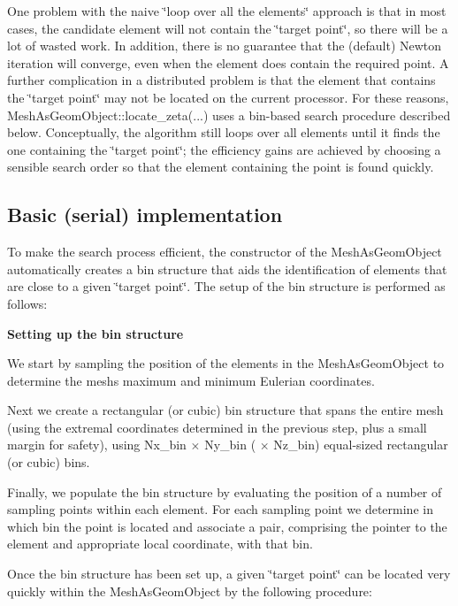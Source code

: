 One problem with the naive \char`\"{}loop over all the elements\char`\"{} approach is that in most cases, the candidate element will not contain the \char`\"{}target
point\char`\"{}, so there will be a lot of wasted work. In addition, there is no guarantee that the (default) Newton iteration will converge, even when the element does contain the required point. A further complication in a distributed problem is that the element that contains the \char`\"{}target point\char`\"{} may not be located on the current processor. For these reasons, {\ttfamily Mesh\+As\+Geom\+Object\+::locate\+\_\+zeta}(...) uses a bin-\/based search procedure described below. Conceptually, the algorithm still loops over all elements until it finds the one containing the \char`\"{}target
point\char`\"{}; the efficiency gains are achieved by choosing a sensible search order so that the element containing the point is found quickly.



\hypertarget{index_impl}{}\subsection{Basic (serial) implementation}\label{index_impl}
To make the search process efficient, the constructor of the {\ttfamily Mesh\+As\+Geom\+Object} automatically creates a bin structure that aids the identification of elements that are close to a given \char`\"{}target point\char`\"{}. The setup of the bin structure is performed as follows\+: \begin{center} {\bfseries Setting up the bin structure} \end{center} 
\begin{DoxyEnumerate}
\item We start by sampling the position of the elements in the {\ttfamily Mesh\+As\+Geom\+Object} to determine the mesh\textquotesingle{}s maximum and minimum Eulerian coordinates. ~\newline
~\newline

\item Next we create a rectangular (or cubic) bin structure that spans the entire mesh (using the extremal coordinates determined in the previous step, plus a small margin for safety), using {\ttfamily Nx\+\_\+bin} $ \times $ {\ttfamily Ny\+\_\+bin} ( $ \times $ {\ttfamily Nz\+\_\+bin}) equal-\/sized rectangular (or cubic) bins. ~\newline
~\newline

\item Finally, we populate the bin structure by evaluating the position of a number of sampling points within each element. For each sampling point we determine in which bin the point is located and associate a pair, comprising the pointer to the element and appropriate local coordinate, with that bin. ~\newline
~\newline

\end{DoxyEnumerate}Once the bin structure has been set up, a given \char`\"{}target point\char`\"{} can be located very quickly within the {\ttfamily Mesh\+As\+Geom\+Object} by the following procedure\+:

